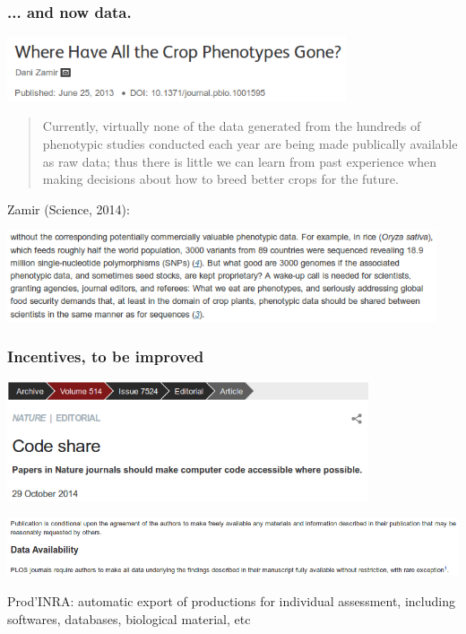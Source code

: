\documentclass[c]{beamer} %
\begin{document}
\begin{frame}
  \frametitle{... and now data.}
  \begin{center}
    \includegraphics[width=0.75\textwidth,height=0.90\textheight,keepaspectratio=true]{2013-06_DZamir_title}%
  \end{center}
  \pause
  \begin{quote}
    Currently, virtually none of the data generated from the hundreds of phenotypic studies conducted each year are being made publically available as raw data; thus there is little we can learn from past experience when making decisions about how to breed better crops for the future.
  \end{quote}
  
  \bigskip
  \pause
  
  Zamir (Science, 2014):
  \begin{center}
    \includegraphics[width=0.95\textwidth,height=0.90\textheight,keepaspectratio=true]{2014-09_DZamir_text}%
  \end{center}
\end{frame}

\begin{frame}
  \frametitle{Incentives, to be improved}
  \begin{center}
    \includegraphics[width=0.8\textwidth,height=0.90\textheight,keepaspectratio=true]{2014-10_Nature_code-share}%
  \end{center}
  
  \begin{center}
    \includegraphics[width=1\textwidth,height=1.2\textheight,keepaspectratio=true]{2014-10_PLoS_data-availability}%
  \end{center}
  
  \bigskip
  \pause
  
  Prod'INRA: automatic export of productions for individual assessment, including softwares, databases, biological material, etc
\end{frame}
\end{document}
